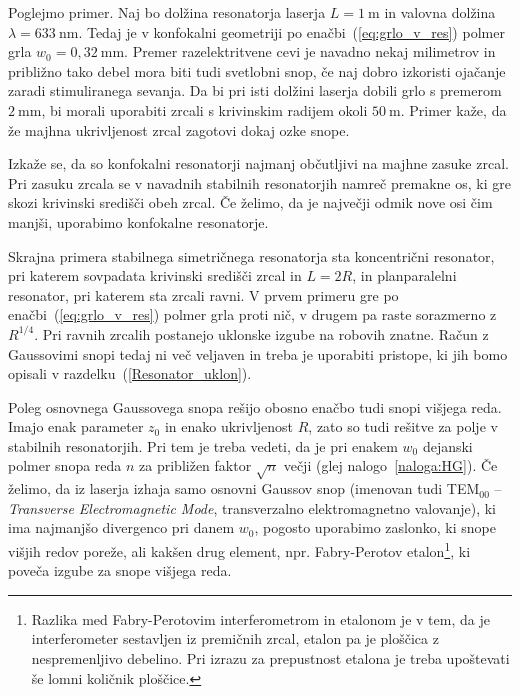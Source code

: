 Poglejmo primer. Naj bo dolžina resonatorja laserja $L=1~\si{\metre}$ in valovna
dolžina $\lambda = 633~\si{\nano\metre}$. Tedaj je v konfokalni geometriji po enačbi~(\ref{eq:grlo_v_res})
polmer grla $w_{0}=0,32~\si{\milli\metre}$. Premer razelektritvene cevi je navadno
nekaj milimetrov in približno tako debel mora biti tudi svetlobni
snop, če naj dobro izkoristi ojačanje zaradi stimuliranega sevanja.
Da bi pri isti dolžini laserja dobili grlo s premerom $2~\si{\milli\metre}$, bi morali
uporabiti zrcali s krivinskim radijem okoli $50~\si{\metre}$. 
Primer kaže, da že majhna ukrivljenost zrcal zagotovi dokaj ozke snope.

\begin{remark}
Izkaže se, da so konfokalni resonatorji najmanj občutljivi na majhne zasuke zrcal. 
Pri zasuku zrcala se v navadnih stabilnih resonatorjih namreč premakne os, ki gre skozi 
krivinski središči obeh zrcal. Če želimo, da je največji odmik nove osi čim
manjši, uporabimo konfokalne resonatorje. 
\end{remark}

Skrajna primera stabilnega simetričnega resonatorja sta 
koncentrični resonator,
pri katerem sovpadata krivinski središči zrcal in $L=2R$, in planparalelni 
resonator, pri katerem sta zrcali ravni.
V prvem primeru gre po enačbi~(\ref{eq:grlo_v_res}) polmer grla proti nič, v drugem pa raste sorazmerno
z $R^{1/4}$. Pri ravnih zrcalih postanejo uklonske
izgube na robovih znatne. Račun z Gaussovimi snopi tedaj ni več veljaven
in treba je uporabiti pristope, ki jih bomo opisali
v razdelku~(\ref{Resonator_uklon}).

Poleg osnovnega Gaussovega snopa rešijo obosno enačbo tudi snopi višjega reda. 
Imajo enak parameter $z_{0}$ in enako ukrivljenost $R$, zato so tudi 
rešitve za polje v stabilnih
resonatorjih. Pri tem je treba vedeti, da je pri enakem $w_{0}$
dejanski polmer snopa reda $n$ za približen faktor $\sqrt{n}$ večji 
(glej nalogo~\ref{naloga:HG}). Če želimo, da iz laserja izhaja samo 
osnovni Gaussov snop (imenovan tudi TEM$_{00}$ -- {\it Transverse Electromagnetic Mode}, 
transverzalno elektromagnetno valovanje), ki ima najmanjšo 
divergenco pri danem $w_0$, pogosto uporabimo zaslonko, ki snope višjih redov poreže, 
ali kakšen drug element, npr. Fabry-Perotov etalon\footnote{Razlika med Fabry-Perotovim
interferometrom in etalonom je v tem, da je interferometer sestavljen iz premičnih 
zrcal, etalon pa je ploščica z nespremenljivo debelino. Pri izrazu za prepustnost etalona
je treba upoštevati še lomni količnik ploščice.}, ki poveča izgube za snope višjega reda.
 
